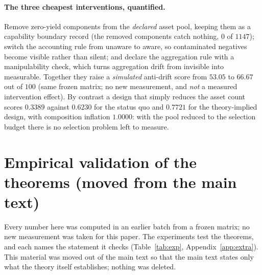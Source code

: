 \documentclass{article}
\begin{document}
\paragraph{The three cheapest interventions, quantified.} Remove zero-yield components from the
\emph{declared} asset pool, keeping them as a capability boundary record (the removed components catch
nothing, $0$ of $1147$); switch the accounting rule from unaware to aware, so contaminated negatives become
visible rather than silent; and declare the aggregation rule with a manipulability check, which turns
aggregation drift from invisible into measurable. Together they raise a \emph{simulated} anti-drift score
from $53.05$ to $66.67$ out of $100$ (same frozen matrix; no new measurement, and \emph{not} a measured
intervention effect). By contrast a design that simply reduces the asset count scores $0.3389$ against
$0.6230$ for the status quo and $0.7721$ for the theory-implied design, with composition inflation
$1.0000$: with the pool reduced to the selection budget there is no selection problem left to measure.

\section{Empirical validation of the theorems (moved from the main text)}
\label{app:empirical}

Every number here was computed in an earlier batch from a frozen matrix; no new measurement was taken for
this paper. The experiments test the theorems, and each names the statement it checks
(Table~\ref{tab:exp}, Appendix~\ref{app:extra}). This material was moved out of the main text so that the
main text states only what the theory itself establishes; nothing was deleted.
\end{document}
